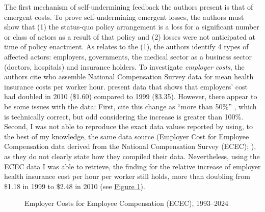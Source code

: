 \documentclass[11pt]{article}
\begin{document}
The first mechanism of self-undermining feedback the authors present is that of emergent costs. To prove self-undermining emergent losses, the authors must show that (1) the status-quo policy arrangement is a loss for a significant number or class of actors as a result of that policy and (2) losses were not anticipated at time of policy enactment. As relates to the (1), the authors identify 4 types of affected actors: employers, governments, the medical sector as a business sector (doctors, hospitals) and insurance holders. To investigate \textit{employer costs}, the authors cite \textcite[][]{Claxton2011} who assemble National Compensation Survey data for mean health insurance costs per worker hour. \textcite[][]{Claxton2011} present data that shows that employers' cost had doubled in 2010 (\$1.60) compared to 1999 (\$3.35). However, there appear to be some issues with the data: First, \textcite[][]{Jacobs2014} cite this change as \enquote{more than 50\%} , which is technically correct, but odd considering the increase is greater than 100\%. Second, I was not able to reproduce the exact data values reported by \textcite[][]{Claxton2011} using, to the best of my knowledge, the same data source (Employer Cost for Employee Compensation data derived from the National Compensation Survey (ECEC); ), as they do not clearly state how they compiled their data. Nevertheless, using the ECEC data I was able to retrieve, the finding for the relative increase of employer health insurance cost per hour per worker still holds, more than doubling from \$1.18 in 1999 to \$2.48 in 2010 (see \hyperref[fig:ecec]{Figure \ref*{fig:ecec}}).

\begin{figure}[H]
  \sffamily
  \caption{Employer Costs for Employee Compensation (ECEC), 1993--2024}
  
  \label{fig:ecec}
\end{figure}
\end{document}
